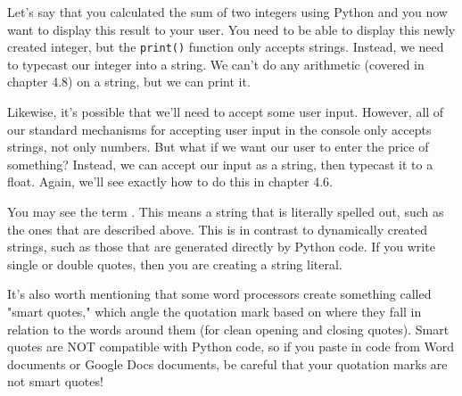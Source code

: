 Let's say that you calculated the sum of two integers using Python and you now want to display this result to your user. You need to be able to display this newly created integer, but the \verb|print()| function only accepts strings. Instead, we need to typecast our integer into a string. We can't do any arithmetic (covered in chapter 4.8) on a string, but we can print it.\par
Likewise, it's possible that we'll need to accept some user input. However, all of our standard mechanisms for accepting user input in the console only accepts strings, not only numbers. But what if we want our user to enter the price of something? Instead, we can accept our input as a string, then typecast it to a float. Again, we'll see exactly how to do this in chapter 4.6.\par
You may see the term . This means a string that is literally spelled out, such as the ones that are described above. This is in contrast to dynamically created strings, such as those that are generated directly by Python code. If you write single or double quotes, then you are creating a string literal.\par
It's also worth mentioning that some word processors create something called "smart quotes," which angle the quotation mark based on where they fall in relation to the words around them (for clean opening and closing quotes). Smart quotes are NOT compatible with Python code, so if you paste in code from Word documents or Google Docs documents, be careful that your quotation marks are not smart quotes!\par
{}
